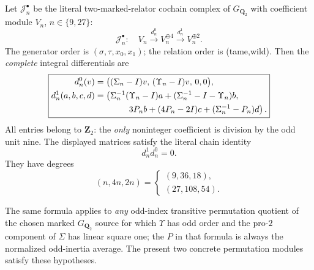 \begin{theorem}
\label{thm:dyadic-f135-27sheet-fox-block-formula}
Let
$\mathcal J_n^\bullet$
be the literal
two-marked-relator
cochain complex of
$G_{\mathbf Q_2}$
with coefficient
module $V_n$,
$n\in\{9,27\}$:
\[
\mathcal J_n^\bullet:
\quad
V_n\xrightarrow{d^0_n}
V_n^{\oplus4}
\xrightarrow{d^1_n}
V_n^{\oplus2}.
\]
The generator order is
$(\sigma,\tau,x_0,x_1)$;
the relation order is
(tame,wild).
Then the \emph{complete}
integral differentials
are
\begin{equation}\label{eq:dyadic-f135-27sheet-fox-matrix}
\boxed{
\begin{aligned}
d_n^0(v)&=
\bigl((\Sigma_n-I)v,\,
      (\Upsilon_n-I)v,\,
      0,0\bigr),\\
d_n^1(a,b,c,d)
&=\left(
 \Sigma_n^{-1}(\Upsilon_n-I)a
 +(\Sigma_n^{-1}-I-\Upsilon_n)b,\right.\\
&\hspace{3.7em}\left.
 3P_nb+(4P_n-2I)c
 +(\Sigma_n^{-1}-P_n)d
\right).
\end{aligned}}
\end{equation}
All entries belong to
$\mathbf Z_2$:
the \emph{only}
noninteger coefficient
is division by
the odd unit nine.
The displayed matrices
satisfy the literal
chain identity
\begin{equation}\label{eq:dyadic-f135-27sheet-dsq}
\boxed{\qquad
d_n^1d_n^0=0.
\qquad}
\end{equation}
They have degrees
\begin{equation}\label{eq:dyadic-f135-n-sheet-complex-degrees}
\boxed{
(n,4n,2n)=
\begin{cases}
(9,36,18),\\
(27,108,54).
\end{cases}}
\end{equation}

The same formula
applies to
\emph{any}
odd-index transitive
permutation quotient
of the chosen
marked $G_{\mathbf Q_2}$
source for which
$\Upsilon$ has odd
order and the
pro-$2$ component
of $\Sigma$ has
linear square one;
the $P$ in that
formula is always
the normalized
odd-inertia average.
The present
two concrete
permutation modules
satisfy these
hypotheses.
\end{theorem}

